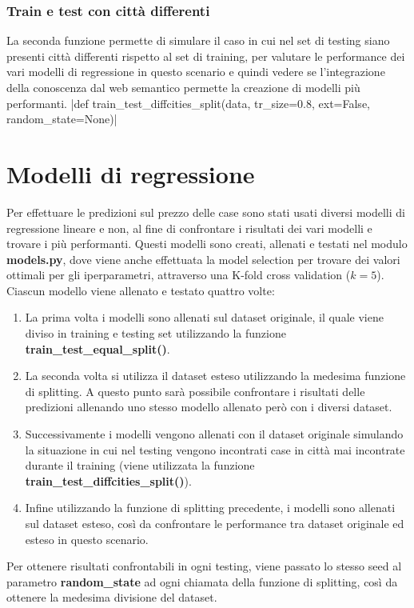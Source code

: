 \documentclass{article}
\begin{document}
\subsubsection{Train e test con città differenti}
\label{sec:diffsplit}
La seconda funzione permette di simulare il caso in cui nel set di testing
siano presenti città differenti rispetto al set di training, per valutare le
performance dei vari modelli di regressione in questo scenario e quindi
vedere se l'integrazione della conoscenza dal web semantico permette la
creazione di modelli più performanti.
|def train_test_diffcities_split(data, tr_size=0.8, ext=False, random_state=None)|

\section{Modelli di regressione}
\label{sec:regressionintro}
Per effettuare le predizioni sul prezzo delle case sono stati usati diversi
modelli di regressione lineare e non, al fine di confrontare i risultati dei
vari modelli e trovare i più performanti. Questi modelli sono creati, allenati
e testati nel modulo \textbf{models.py}, dove viene anche effettuata la model
selection per trovare dei valori ottimali per gli iperparametri, attraverso
una K-fold cross validation ($k = 5$). Ciascun modello viene allenato e testato
quattro volte:
\begin{enumerate}
	\item La prima volta i modelli sono allenati sul dataset originale, il
		quale viene diviso in training e testing set utilizzando la funzione
		\textbf{train\_test\_equal\_split()}.
	\item La seconda volta si utilizza il dataset esteso utilizzando la
		medesima funzione di splitting. A questo punto sarà possibile
		confrontare i risultati delle predizioni allenando uno stesso modello
		allenato però con i diversi dataset.
	\item Successivamente i modelli vengono allenati con il dataset originale
		simulando la situazione in cui nel testing vengono incontrati case
		in città mai incontrate durante il training (viene utilizzata la
		funzione \textbf{train\_test\_diffcities\_split()}).
	\item Infine utilizzando la funzione di splitting precedente, i
		modelli sono allenati sul dataset esteso, così da confrontare le
		performance tra dataset originale ed esteso in questo scenario.
\end{enumerate}
Per ottenere risultati confrontabili in ogni testing, viene passato lo stesso
seed al parametro \textbf{random\_state} ad ogni chiamata della funzione di
splitting, così da ottenere la medesima divisione del dataset.
\end{document}
